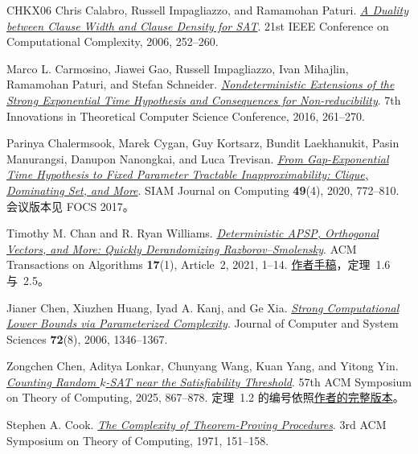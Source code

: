 \documentclass[11pt,reqno]{amsart}
\numberwithin{equation}{section}
\theoremstyle{definition}\newtheorem{definition}[theorem]{定义}
\theoremstyle{remark}\newtheorem{remark}[theorem]{注}
\begin{document}
\begin{thebibliography}{CHKX06}
Chris Calabro, Russell Impagliazzo, and Ramamohan Paturi.
\href{https://cseweb.ucsd.edu/~paturi/myPapers/pubs/CalabroImpagliazzoPaturi_2006_ccc.pdf}
{\emph{A Duality between Clause Width and Clause Density for SAT}}.
21st IEEE Conference on Computational Complexity, 2006, 252--260.

Marco L. Carmosino, Jiawei Gao, Russell Impagliazzo, Ivan Mihajlin,
Ramamohan Paturi, and Stefan Schneider.
\href{https://doi.org/10.1145/2840728.2840746}
{\emph{Nondeterministic Extensions of the Strong Exponential Time
Hypothesis and Consequences for Non-reducibility}}.
7th Innovations in Theoretical Computer Science Conference, 2016, 261--270.

Parinya Chalermsook, Marek Cygan, Guy Kortsarz, Bundit Laekhanukit,
Pasin Manurangsi, Danupon Nanongkai, and Luca Trevisan.
\href{https://doi.org/10.1137/18M1166869}
{\emph{From Gap-Exponential Time Hypothesis to Fixed Parameter Tractable
Inapproximability: Clique, Dominating Set, and More}}.
SIAM Journal on Computing \textbf{49}(4), 2020, 772--810.
会议版本见 FOCS 2017。

Timothy M. Chan and R. Ryan Williams.
\href{https://doi.org/10.1145/3402926}
{\emph{Deterministic APSP, Orthogonal Vectors, and More:
Quickly Derandomizing Razborov--Smolensky}}.
ACM Transactions on Algorithms \textbf{17}(1), Article~2, 2021, 1--14.
\href{https://people.csail.mit.edu/rrw/derand-apsp-ov-cr-talg.pdf}{作者手稿}，定理~1.6 与~2.5。

Jianer Chen, Xiuzhen Huang, Iyad A. Kanj, and Ge Xia.
\href{https://doi.org/10.1016/j.jcss.2006.04.007}
{\emph{Strong Computational Lower Bounds via Parameterized Complexity}}.
Journal of Computer and System Sciences \textbf{72}(8), 2006, 1346--1367.

Zongchen Chen, Aditya Lonkar, Chunyang Wang, Kuan Yang, and Yitong Yin.
\href{https://doi.org/10.1145/3717823.3718163}
{\emph{Counting Random $k$-SAT near the Satisfiability Threshold}}.
57th ACM Symposium on Theory of Computing, 2025, 867--878.
定理~1.2 的编号依照\href{https://wcysai.com/publication/randomksat/randomkSAT.pdf}{作者的完整版本}。

Stephen A. Cook.
\href{https://www.cs.utoronto.ca/~sacook/homepage/1971.pdf}
{\emph{The Complexity of Theorem-Proving Procedures}}.
3rd ACM Symposium on Theory of Computing, 1971, 151--158.


\end{thebibliography}
\end{document}
